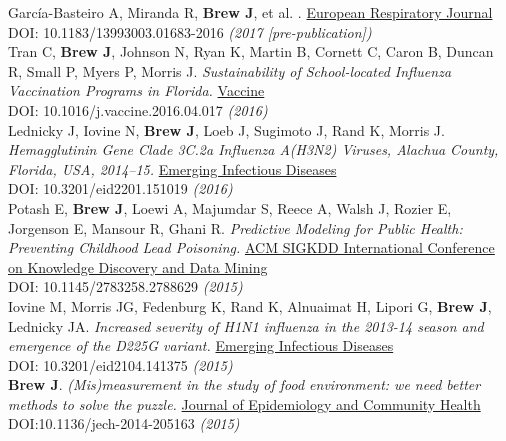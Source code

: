 \documentclass[11pt]{article}
\begin{document}
\noindent García-Basteiro A, Miranda R, \textbf{Brew J}, et al. . \href{http://erj.ersjournals.com}{European Respiratory Journal} \\
DOI: 10.1183/13993003.01683-2016 \hfill \emph{(2017 [pre-publication])} \\

\noindent Tran C, \textbf{Brew J}, Johnson N, Ryan K, Martin B, Cornett C, Caron B, Duncan R, Small P, Myers P, Morris J. \emph{Sustainability of School-located Influenza Vaccination Programs in Florida.} \href{http://www.journals.elsevier.com/vaccine}{Vaccine} \\
DOI: 10.1016/j.vaccine.2016.04.017 \hfill \emph{(2016)} \\

\noindent Lednicky J, Iovine N, \textbf{Brew J}, Loeb J, Sugimoto J, Rand K, Morris J. \emph{Hemagglutinin Gene Clade 3C.2a Influenza A(H3N2) Viruses, Alachua County, Florida, USA, 2014–15.} \href{http://wwwnc.cdc.gov/eid/article/22/1/15-1019_article}{Emerging Infectious Diseases} \\
DOI: 10.3201/eid2201.151019 \hfill \emph{(2016)} \\

\noindent Potash E, \textbf{Brew J}, Loewi A, Majumdar S, Reece A, Walsh J, Rozier E, Jorgenson E, Mansour R, Ghani R. \emph{Predictive Modeling for Public Health: Preventing Childhood Lead Poisoning.} \href{http://dl.acm.org/citation.cfm?id=2788629&dl=ACM&coll=DL&CFID=747855435&CFTOKEN=56343631}{ACM SIGKDD International Conference on Knowledge Discovery and Data Mining} \\  
DOI: 10.1145/2783258.2788629 \hfill \emph{(2015)}\\

\noindent Iovine M, Morris JG, Fedenburg K, Rand K, Alnuaimat H, Lipori G, \textbf{Brew J}, Lednicky JA. \emph{Increased severity of H1N1 influenza in the 2013-14 season and emergence of the D225G variant.} \href{http://wwwnc.cdc.gov/eid/article/21/4/14-1375_article}{Emerging Infectious Diseases} \\
DOI: 10.3201/eid2104.141375 \hfill \emph{(2015)}\\


\noindent \textbf{Brew J}. \emph{(Mis)measurement in the study of food environment: we need better methods to solve the puzzle.} \href{http://jech.bmj.com/}{Journal of Epidemiology and Community Health} \\
DOI:10.1136/jech-2014-205163 \hfill \emph{(2015)}\\
\end{document}
